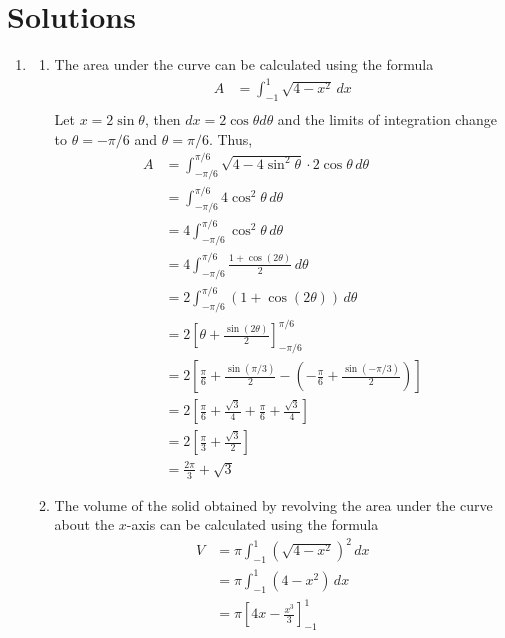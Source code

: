 \documentclass[10pt,openany,a4paper]{article}
\theoremstyle{definition}
\theoremstyle{definition}
\theoremstyle{plain}
\begin{document}
\section{Solutions}
\begin{enumerate}
    \item \begin{enumerate}
        \item The area under the curve can be calculated using the formula
        \begin{align*}
            A &= \int_{-1}^{1} \sqrt{4-x^2} \, dx \\
        \end{align*}
        Let $x=2\sin\theta$, then $dx=2\cos\theta d\theta$ and the limits of integration change to $\theta=-\pi/6$ and $\theta=\pi/6$. Thus,
        \begin{align*}
            A &= \int_{-\pi/6}^{\pi/6} \sqrt{4-4\sin^2\theta} \cdot 2\cos\theta \, d\theta \\
            &= \int_{-\pi/6}^{\pi/6} 4\cos^2\theta \, d\theta \\
            &= 4 \int_{-\pi/6}^{\pi/6} \cos^2\theta \, d\theta \\
            &= 4 \int_{-\pi/6}^{\pi/6} \frac{1+\cos(2\theta)}{2} \, d\theta \\
            &= 2 \int_{-\pi/6}^{\pi/6} (1+\cos(2\theta)) \, d\theta \\
            &= 2 \left[ \theta + \frac{\sin(2\theta)}{2} \right]_{-\pi/6}^{\pi/6} \\
            &= 2 \left[ \frac{\pi}{6} + \frac{\sin(\pi/3)}{2} - \left(-\frac{\pi}{6} + \frac{\sin(-\pi/3)}{2}\right) \right] \\
            &= 2 \left[ \frac{\pi}{6} + \frac{\sqrt{3}}{4} + \frac{\pi}{6} + \frac{\sqrt{3}}{4} \right] \\
            &= 2 \left[ \frac{\pi}{3} + \frac{\sqrt{3}}{2} \right] \\
            &= \frac{2\pi}{3} + \sqrt{3}
        \end{align*}
        \item The volume of the solid obtained by revolving the area under the curve about the $x$-axis can be calculated using the formula
        \begin{align*}
            V &= \pi \int_{-1}^{1} (\sqrt{4-x^2})^2 \, dx \\
            &= \pi \int_{-1}^{1} (4-x^2) \, dx \\
            &= \pi \left[ 4x - \frac{x^3}{3} \right]_{-1}^{1} \\

\end{align*}
\end{enumerate}
\end{enumerate}
\end{document}
